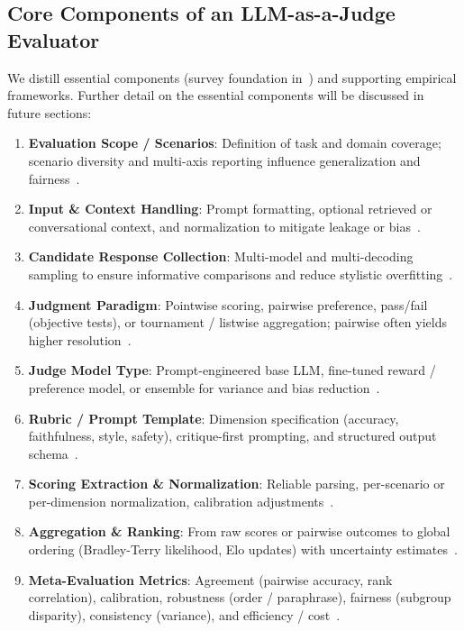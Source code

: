 \subsection{Core Components of an LLM-as-a-Judge Evaluator}
We distill essential components (survey foundation in~\cite{li2024_llmsasjudges}) and supporting empirical frameworks. Further detail on the essential components will be discussed in future sections:
\begin{enumerate}
	\item \textbf{Evaluation Scope / Scenarios}: Definition of task and domain coverage; scenario diversity and multi-axis reporting influence generalization and fairness~\cite{liang2022helm, srivastava2022bigbench}.
	\item \textbf{Input \& Context Handling}: Prompt formatting, optional retrieved or conversational context, and normalization to mitigate leakage or bias~\cite{liang2022helm, hada2024metal}.
	\item \textbf{Candidate Response Collection}: Multi-model and multi-decoding sampling to ensure informative comparisons and reduce stylistic overfitting~\cite{zheng2023judgelm, chen2021evaluating}.
	\item \textbf{Judgment Paradigm}: Pointwise scoring, pairwise preference, pass/fail (objective tests), or tournament / listwise aggregation; pairwise often yields higher resolution~\cite{bradley1952rank, zheng2023judgelm, liu2024pairs, chen2021evaluating}.
	\item \textbf{Judge Model Type}: Prompt-engineered base LLM, fine-tuned reward / preference model, or ensemble for variance and bias reduction~\cite{stiennon2020learning, ouyang2022training, bavaresco2024judgebench}.
	\item \textbf{Rubric / Prompt Template}: Dimension specification (accuracy, faithfulness, style, safety), critique-first prompting, and structured output schema~\cite{fu2023gptscore, li2024_llmsasjudges}.
	\item \textbf{Scoring Extraction \& Normalization}: Reliable parsing, per-scenario or per-dimension normalization, calibration adjustments~\cite{liang2022helm, bavaresco2024judgebench}.
	\item \textbf{Aggregation \& Ranking}: From raw scores or pairwise outcomes to global ordering (Bradley-Terry likelihood, Elo updates) with uncertainty estimates~\cite{bradley1952rank, elo1978rating, zheng2023judgelm}.
	\item \textbf{Meta-Evaluation Metrics}: Agreement (pairwise accuracy, rank correlation), calibration, robustness (order / paraphrase), fairness (subgroup disparity), consistency (variance), and efficiency / cost~\cite{bavaresco2024judgebench, hada2024metal, li2024_llmsasjudges}.

\end{enumerate}
